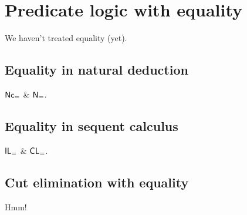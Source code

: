 %
\chapter{Predicate logic with equality}
\label{c-equality}
%
We haven't treated equality (yet).

\section{Equality in natural deduction}

\( \mathsf{Nc_=} \) \& \( \mathsf{N_=} \).

\section{Equality in sequent calculus}

\( \mathsf{IL}_= \) \& \( \mathsf{CL}_= \).

\section{Cut elimination with equality}

Hmm!